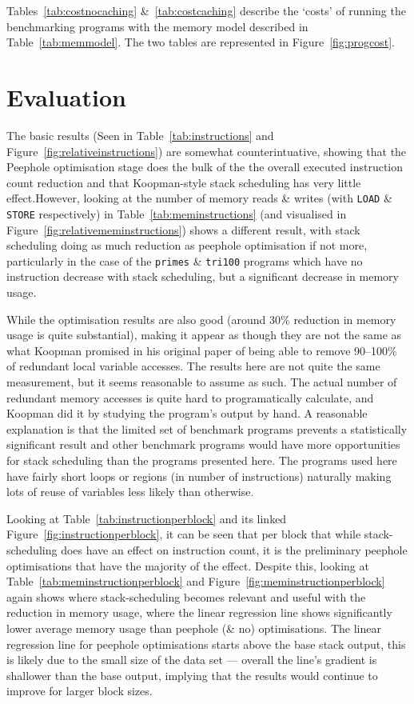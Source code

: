 Tables~\ref{tab:costnocaching} \&~\ref{tab:costcaching} describe the `costs' of
running the benchmarking programs with the memory model described in
Table~\ref{tab:memmodel}. The two tables are represented in
Figure~\ref{fig:progcost}.

\section{Evaluation}\label{sec:testingevaluation}
The basic results (Seen in Table~\ref{tab:instructions} and
Figure~\ref{fig:relativeinstructions}) are somewhat counterintuative, showing
that the Peephole optimisation stage does the bulk of the the overall executed
instruction count reduction and that Koopman-style stack scheduling has very
little effect.However, looking at the number of memory reads \& writes (with
\lstinline{LOAD} \& \lstinline{STORE} respectively) in
Table~\ref{tab:meminstructions} (and visualised in
Figure~\ref{fig:relativememinstructions}) shows a different result, with stack
scheduling doing as much reduction as peephole optimisation if not more,
particularly in the case of the \texttt{primes} \& \texttt{tri100} programs
which have no instruction decrease with stack scheduling, but a significant
decrease in memory usage.

While the optimisation results are also good (around 30\% reduction in memory
usage is quite substantial), making it appear as though they are not the same as
what Koopman promised in his original paper of being able to remove 90--100\% of
redundant local variable accesses. The results here are not quite the same
measurement, but it seems reasonable to assume as such. The actual number of
redundant memory accesses is quite hard to programatically calculate, and
Koopman did it by studying the program's output by hand. A reasonable
explanation is that the limited set of benchmark programs prevents a
statistically significant result and other benchmark programs would have more
opportunities for stack scheduling than the programs presented here. The
programs used here have fairly short loops or regions (in number of
instructions) naturally making lots of reuse of variables less likely than
otherwise.

Looking at Table~\ref{tab:instructionperblock} and its linked
Figure~\ref{fig:instructionperblock}, it can be seen that per block that while
stack-scheduling does have an effect on instruction count, it is the preliminary
peephole optimisations that have the majority of the effect. Despite this,
looking at Table~\ref{tab:meminstructionperblock} and
Figure~\ref{fig:meminstructionperblock} again shows where stack-scheduling
becomes relevant and useful with the reduction in memory usage, where the linear
regression line shows significantly lower average memory usage than peephole (\&
no) optimisations. The linear regression line for peephole optimisations starts
above the base stack output, this is likely due to the small size of the data
set --- overall the line's gradient is shallower than the base output, implying
that the results would continue to improve for larger block sizes.

